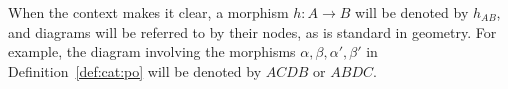 \begin{notation}
    When the context makes it clear, a morphism \( h : A \to B \) will be denoted by \( h_{AB} \), and diagrams will be referred to by their nodes, as is standard in geometry. For example, the diagram involving the morphisms \( \alpha, \beta, \alpha', \beta' \) in Definition~\ref{def:cat:po} will be denoted by \( ACDB \) or \( ABDC \).
\end{notation}   